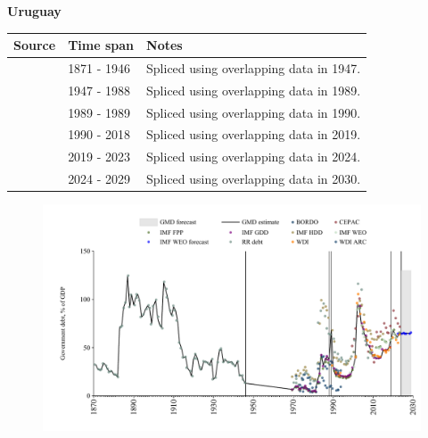 \documentclass[12pt,a4paper,landscape]{article}
\begin{document}
\begin{adjustbox}{max totalsize={\paperwidth}{\paperheight},center}
\begin{minipage}[t][\textheight][t]{\textwidth}
\vspace*{0.5cm}
{}
\begin{center}
{\Large\bfseries Uruguay}
\end{center}
\vspace{0.5cm}
\begin{table}[H]
\centering
\small
\begin{tabular}{|l|l|l|}
\hline
\textbf{Source} & \textbf{Time span} & \textbf{Notes} \\
\hline
\rowcolor{white}\cite{RR_debt}& 1871 - 1946 &Spliced using overlapping data in 1947.\\
\rowcolor{lightgray}\cite{IMF_GDD}& 1947 - 1988 &Spliced using overlapping data in 1989.\\
\rowcolor{white}\cite{IMF_HDD}& 1989 - 1989 &Spliced using overlapping data in 1990.\\
\rowcolor{lightgray}\cite{IMF_GDD}& 1990 - 2018 &Spliced using overlapping data in 2019.\\
\rowcolor{white}\cite{IMF_FPP}& 2019 - 2023 &Spliced using overlapping data in 2024.\\
\rowcolor{lightgray}\cite{IMF_WEO_forecast}& 2024 - 2029 &Spliced using overlapping data in 2030.\\
\hline
\end{tabular}
\end{table}
\begin{figure}[H]
\centering
\includegraphics[width=\textwidth,height=0.6\textheight,keepaspectratio]{graphs/URY_govdebt_GDP.pdf}
\end{figure}
\end{minipage}
\end{adjustbox}
\end{document}
